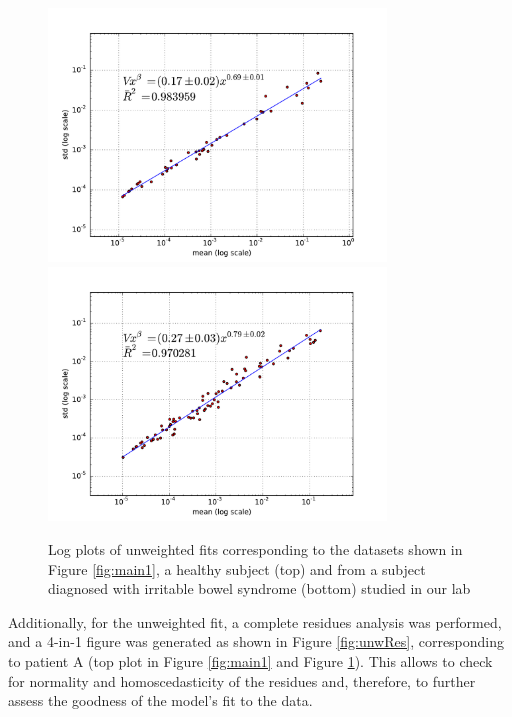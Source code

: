 \begin{figure}
	\centering
	\includegraphics[width=0.8\textwidth]{results/fits/IBS_h_A_amplicons_family_stdVSmean_LLR_LOG.pdf}
	\includegraphics[width=0.8\textwidth]{results/fits/IBS_P1_metatranscriptomes_family_stdVSmean_LLR_LOG.pdf}
	\caption{Log plots of unweighted fits corresponding to the datasets shown in Figure \ref{fig:main1}, a healthy subject (top) and from a subject diagnosed with irritable bowel syndrome (bottom) studied in our lab \cite{IBS}}
	\label{fig:fits}
\end{figure}

Additionally, for the unweighted fit, a complete residues analysis was performed, and a 4-in-1 figure was generated as shown in Figure \ref{fig:unwRes}, corresponding to patient A (top plot in Figure \ref{fig:main1} and Figure \ref{fig:fits}). This allows to check for normality and homoscedasticity of the residues and, therefore, to further assess the goodness of the model's fit to the data.

